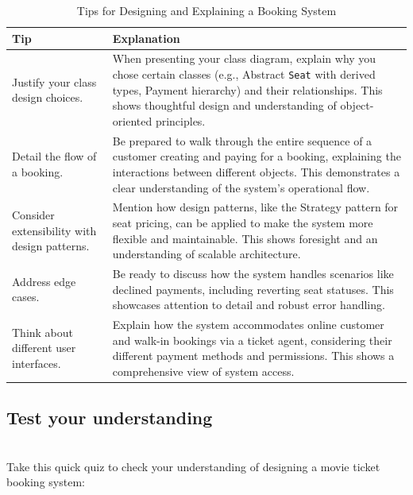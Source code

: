 \begin{table}[h!]
\centering
\begin{tabular}{|p{6cm}|p{9cm}|}
\hline
\textbf{Tip} & \textbf{Explanation} \\
\hline
Justify your class design choices. & When presenting your class diagram, explain why you chose certain classes (e.g., Abstract \texttt{Seat} with derived types, Payment hierarchy) and their relationships. This shows thoughtful design and understanding of object-oriented principles. \\
\hline
Detail the flow of a booking. & Be prepared to walk through the entire sequence of a customer creating and paying for a booking, explaining the interactions between different objects. This demonstrates a clear understanding of the system’s operational flow. \\
\hline
Consider extensibility with design patterns. & Mention how design patterns, like the Strategy pattern for seat pricing, can be applied to make the system more flexible and maintainable. This shows foresight and an understanding of scalable architecture. \\
\hline
Address edge cases. & Be ready to discuss how the system handles scenarios like declined payments, including reverting seat statuses. This showcases attention to detail and robust error handling. \\
\hline
Think about different user interfaces. & Explain how the system accommodates online customer and walk-in bookings via a ticket agent, considering their different payment methods and permissions. This shows a comprehensive view of system access. \\
\hline
\end{tabular}
\caption{Tips for Designing and Explaining a Booking System}
\label{tab:booking_system_tips}
\end{table}

\subsection{Test your understanding}\label{w_oUd6QYdMbpBk7gWlzUB}
\\
Take this quick quiz to check your understanding of designing a movie ticket booking system:

